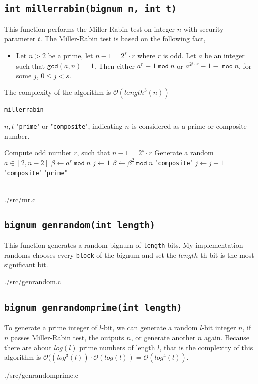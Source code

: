 \subsection{\texttt{int millerrabin(bignum n, int t)}}
This function performs the Miller-Rabin test on integer $n$ with security
parameter $t$. The Miller-Rabin test is based on the following fact,
\begin{itemize}
 \item[] Let $n > 2$ be a prime, let $n-1=2^s\cdot r$ where $r$ is odd. Let
   $a$ be an integer such that $\texttt{gcd}(a, n) = 1$. Then either $a^r
   \equiv 1\ \texttt{mod} \ n$ or $a^{2^j\cdot r} -1 \equiv \ \texttt{mod}\ n$,
   for some $j$, $0 \leq j < s$.
\end{itemize}
The complexity of the algorithm is $\mathcal{O}(length^3(n))$
\begin{algorithm} 
\caption{\texttt{millerrabin}}
  \begin{algorithmic}[1]
    \Require $n, t$
    \Ensure "\texttt{prime}" or "\texttt{composite}", indicating $n$ is
    considered as a prime or composite number.

    \State Compute odd number $r$, such that $n-1 = 2^s \cdot r$
      \State Generate a random $a \in [2, n-2]$
      \State $\beta \gets a^r \ \texttt{mod} \ n$
        \State $j \gets 1$
          \State $\beta \gets \beta^2 \ \texttt{mod}\ n$
            \State \Return "\texttt{composite}"
          \EndIf
          \State $j \gets j+1$
        \EndWhile
          \State \Return "\texttt{composite}"
        \EndIf
      \EndIf
    \EndFor
    \State \Return "\texttt{prime}"
  \end{algorithmic}
\end{algorithm}\\



{./src/mr.c}

\subsection{\texttt{bignum genrandom(int length)}}
This function generates a random bignum of \texttt{length} bits. My
implementation randoms chooses every \texttt{block} of the bignum and set the
$length$-th bit is the most significant bit.

{./src/genrandom.c}

\subsection{\texttt{bignum genrandomprime(int length)}}
To generate a prime integer of $l$-bit, we can generate a random $l$-bit
integer $n$, if $n$ passes Miller-Rabin test, the outputs $n$, or generate
another $n$ again. Because there are about $log(l)$ prime numbers of length
$l$, that is the complexity of this algorithm is
$\mathcal{O}((log^3(l))\cdot\mathcal{O}(log(l)) = \mathcal{O}(log^4(l))$.

{./src/genrandomprime.c}
